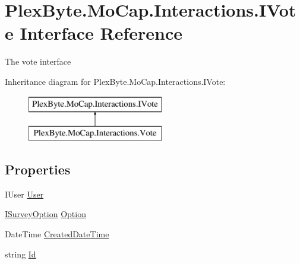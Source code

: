 \hypertarget{interface_plex_byte_1_1_mo_cap_1_1_interactions_1_1_i_vote}{}\section{Plex\+Byte.\+Mo\+Cap.\+Interactions.\+I\+Vote Interface Reference}
\label{interface_plex_byte_1_1_mo_cap_1_1_interactions_1_1_i_vote}


The vote interface  


Inheritance diagram for Plex\+Byte.\+Mo\+Cap.\+Interactions.\+I\+Vote\+:\begin{figure}[H]
\begin{center}
\leavevmode
\includegraphics[height=2.000000cm]{interface_plex_byte_1_1_mo_cap_1_1_interactions_1_1_i_vote}
\end{center}
\end{figure}
\subsection*{Properties}
\begin{DoxyCompactItemize}
\item 
I\+User \hyperlink{interface_plex_byte_1_1_mo_cap_1_1_interactions_1_1_i_vote_a9c352cab0ad680e356283c967c3b8a1e}{User}
\item 
\hyperlink{interface_plex_byte_1_1_mo_cap_1_1_interactions_1_1_i_survey_option}{I\+Survey\+Option} \hyperlink{interface_plex_byte_1_1_mo_cap_1_1_interactions_1_1_i_vote_afcfbb875e80fb14db21e6880e42984e9}{Option}
\item 
Date\+Time \hyperlink{interface_plex_byte_1_1_mo_cap_1_1_interactions_1_1_i_vote_ad249938adad2c0889ca6568ddd9ee577}{Created\+Date\+Time}
\item 
string \hyperlink{interface_plex_byte_1_1_mo_cap_1_1_interactions_1_1_i_vote_a72cae3f576897cfb42b46c4206b0fe0f}{Id}
\end{DoxyCompactItemize}


